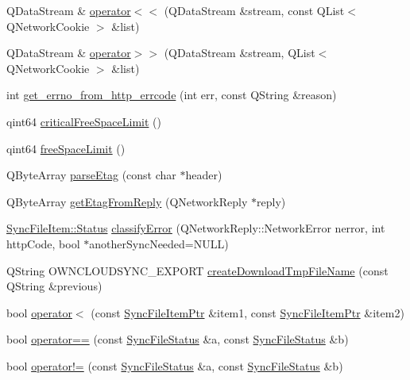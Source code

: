 \begin{DoxyCompactItemize}
\item 
Q\+Data\+Stream \& \hyperlink{namespace_o_c_c_ae2249ddb2048e73e33118c1d07a9c716}{operator$<$$<$} (Q\+Data\+Stream \&stream, const Q\+List$<$ Q\+Network\+Cookie $>$ \&list)
\item 
Q\+Data\+Stream \& \hyperlink{namespace_o_c_c_ad2580b093e189164c924e8c93f992afb}{operator$>$$>$} (Q\+Data\+Stream \&stream, Q\+List$<$ Q\+Network\+Cookie $>$ \&list)
\item 
int \hyperlink{namespace_o_c_c_a743e89f403e11903735a7507b92169e5}{get\+\_\+errno\+\_\+from\+\_\+http\+\_\+errcode} (int err, const Q\+String \&reason)
\item 
qint64 \hyperlink{namespace_o_c_c_a445860e1fc706b08d73845acc1dac5dd}{critical\+Free\+Space\+Limit} ()
\item 
qint64 \hyperlink{namespace_o_c_c_a1b835a945f7c6d134c20ac26267111fd}{free\+Space\+Limit} ()
\item 
Q\+Byte\+Array \hyperlink{namespace_o_c_c_aab916f8e5a0c4077c3e005b05f5b7a8c}{parse\+Etag} (const char $\ast$header)
\item 
Q\+Byte\+Array \hyperlink{namespace_o_c_c_a28e6c65c18ad7868703ba3f1db685a52}{get\+Etag\+From\+Reply} (Q\+Network\+Reply $\ast$reply)
\item 
\hyperlink{class_o_c_c_1_1_sync_file_item_a149ade86eddd9661587bfbc9bcbca408}{Sync\+File\+Item\+::\+Status} \hyperlink{namespace_o_c_c_ab4a5246da8073b7b1f68eff9e8cd543f}{classify\+Error} (Q\+Network\+Reply\+::\+Network\+Error nerror, int http\+Code, bool $\ast$another\+Sync\+Needed=N\+U\+LL)
\item 
Q\+String O\+W\+N\+C\+L\+O\+U\+D\+S\+Y\+N\+C\+\_\+\+E\+X\+P\+O\+RT \hyperlink{namespace_o_c_c_a8f41a179ea2c7464f496e1b8b38285ba}{create\+Download\+Tmp\+File\+Name} (const Q\+String \&previous)
\item 
bool \hyperlink{namespace_o_c_c_ac314fa3234913fc464eea7a8e2b84d74}{operator$<$} (const \hyperlink{namespace_o_c_c_acb6b0db82893659fbd0c98d3c5b8e2b8}{Sync\+File\+Item\+Ptr} \&item1, const \hyperlink{namespace_o_c_c_acb6b0db82893659fbd0c98d3c5b8e2b8}{Sync\+File\+Item\+Ptr} \&item2)
\item 
bool \hyperlink{namespace_o_c_c_a41b5dd4092d2ebfda1992a5ae7476daa}{operator==} (const \hyperlink{class_o_c_c_1_1_sync_file_status}{Sync\+File\+Status} \&a, const \hyperlink{class_o_c_c_1_1_sync_file_status}{Sync\+File\+Status} \&b)
\item 
bool \hyperlink{namespace_o_c_c_aa58b3940b89f2846a59bab7eff10103a}{operator!=} (const \hyperlink{class_o_c_c_1_1_sync_file_status}{Sync\+File\+Status} \&a, const \hyperlink{class_o_c_c_1_1_sync_file_status}{Sync\+File\+Status} \&b)

\end{DoxyCompactItemize}
